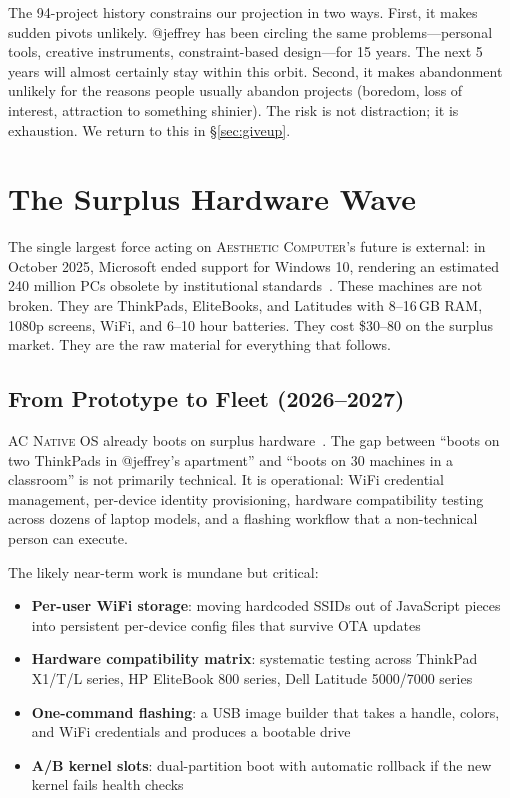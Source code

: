 \documentclass[10pt,letterpaper,twocolumn]{article}
\newcommand{\ac}{\textsc{Aesthetic Computer}}
\newcommand{\acos}{\textsc{AC Native OS}}
\begin{document}
The 94-project history constrains our projection in two ways. First, it makes sudden pivots unlikely. @jeffrey has been circling the same problems---personal tools, creative instruments, constraint-based design---for 15 years. The next 5 years will almost certainly stay within this orbit. Second, it makes abandonment unlikely for the reasons people usually abandon projects (boredom, loss of interest, attraction to something shinier). The risk is not distraction; it is exhaustion. We return to this in \S\ref{sec:giveup}.


\section{The Surplus Hardware Wave}
\label{sec:surplus}

The single largest force acting on \ac{}'s future is external: in October 2025, Microsoft ended support for Windows 10, rendering an estimated 240 million PCs obsolete by institutional standards~\citep{ewaste2024monitor}. These machines are not broken. They are ThinkPads, EliteBooks, and Latitudes with 8--16\,GB RAM, 1080p screens, WiFi, and 6--10 hour batteries. They cost \$30--80 on the surplus market. They are the raw material for everything that follows.

\subsection{From Prototype to Fleet (2026--2027)}

\acos{} already boots on surplus hardware~\citep{scudder2026os}. The gap between ``boots on two ThinkPads in @jeffrey's apartment'' and ``boots on 30 machines in a classroom'' is not primarily technical. It is operational: WiFi credential management, per-device identity provisioning, hardware compatibility testing across dozens of laptop models, and a flashing workflow that a non-technical person can execute.

The likely near-term work is mundane but critical:

\begin{itemize}
  \item \textbf{Per-user WiFi storage}: moving hardcoded SSIDs out of JavaScript pieces into persistent per-device config files that survive OTA updates
  \item \textbf{Hardware compatibility matrix}: systematic testing across ThinkPad X1/T/L series, HP EliteBook 800 series, Dell Latitude 5000/7000 series
  \item \textbf{One-command flashing}: a USB image builder that takes a handle, colors, and WiFi credentials and produces a bootable drive
  \item \textbf{A/B kernel slots}: dual-partition boot with automatic rollback if the new kernel fails health checks
\end{itemize}
\end{document}
